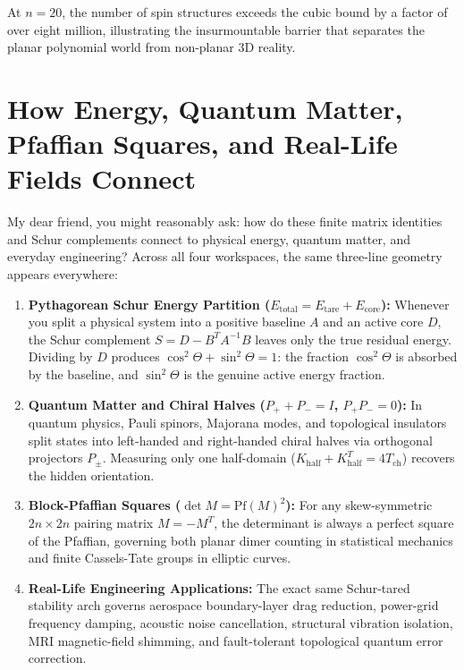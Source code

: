 \documentclass[11pt,a4paper]{article}
\theoremstyle{definition}
\begin{document}
At $n = 20$, the number of spin structures exceeds the cubic bound by a factor of over eight million, illustrating the insurmountable barrier that separates the planar polynomial world from non-planar 3D reality.



\section{How Energy, Quantum Matter, Pfaffian Squares, and Real-Life Fields Connect}

My dear friend, you might reasonably ask: how do these finite matrix identities and Schur complements connect to physical energy, quantum matter, and everyday engineering? Across all four workspaces, the same three-line geometry appears everywhere:

\begin{enumerate}
  \item \textbf{Pythagorean Schur Energy Partition ($E_{\mathrm{total}} = E_{\mathrm{tare}} + E_{\mathrm{core}}$):} Whenever you split a physical system into a positive baseline $A$ and an active core $D$, the Schur complement $S = D - B^T A^{-1} B$ leaves only the true residual energy. Dividing by $D$ produces $\cos^2\Theta + \sin^2\Theta = 1$: the fraction $\cos^2\Theta$ is absorbed by the baseline, and $\sin^2\Theta$ is the genuine active energy fraction.
  \item \textbf{Quantum Matter and Chiral Halves ($P_+ + P_- = I$, $P_+ P_- = 0$):} In quantum physics, Pauli spinors, Majorana modes, and topological insulators split states into left-handed and right-handed chiral halves via orthogonal projectors $P_\pm$. Measuring only one half-domain ($K_{\mathrm{half}} + K_{\mathrm{half}}^T = 4 T_{\mathrm{ch}}$) recovers the hidden orientation.
  \item \textbf{Block-Pfaffian Squares ($\det M = \mathrm{Pf}(M)^2$):} For any skew-symmetric $2n \times 2n$ pairing matrix $M = -M^T$, the determinant is always a perfect square of the Pfaffian, governing both planar dimer counting in statistical mechanics and finite Cassels-Tate groups in elliptic curves.
  \item \textbf{Real-Life Engineering Applications:} The exact same Schur-tared stability arch governs aerospace boundary-layer drag reduction, power-grid frequency damping, acoustic noise cancellation, structural vibration isolation, MRI magnetic-field shimming, and fault-tolerant topological quantum error correction.
\end{enumerate}
\end{document}

